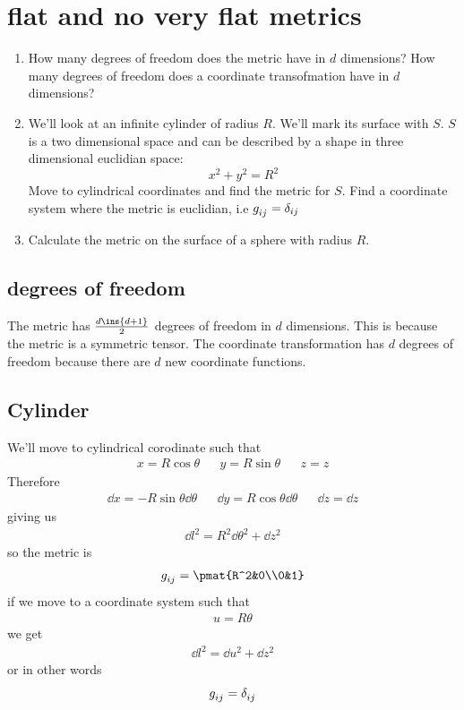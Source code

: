 \clearpage
\section{flat and no very flat metrics}
\begin{colbox}
	\begin{enumerate}
		\item How many degrees of freedom does the metric have in \(d\) dimensions? How many degrees of freedom does a coordinate transofmation have in \(d\) dimensions?
		\item We'll look at an infinite cylinder of radius \(R\). We'll mark its surface with \(S\). \(S\) is a two dimensional space and can be described by a shape in three dimensional euclidian space:
		\begin{equation}
			x^2+y^2=R^2
		\end{equation}
		Move to cylindrical coordinates and find the metric for \(S\). Find a coordinate system where the metric is euclidian, i.e \(g\indices{_i_j} = \delta_{ij}\)
		\item Calculate the metric on the surface of a sphere with radius \(R\).
	\end{enumerate}
\end{colbox}
\subsection{degrees of freedom}
The metric has \(\frac{d\ins{d+1}}{2}\) degrees of freedom in \(d\) dimensions. This is because the metric is a symmetric tensor. The coordinate transformation has \(d\) degrees of freedom because there are \(d\) new coordinate functions.
\subsection{Cylinder}
We'll move to cylindrical corodinate such that
\begin{align}
	x = R\cos\theta && y=R\sin\theta && z=z
\end{align}
Therefore
\begin{align}
	\dd x = -R\sin\theta\dd\theta && \dd y = R\cos\theta\dd\theta && \dd z = \dd z
\end{align}
giving us
\begin{align}
	\dd l^2 = R^2\dd\theta^2 + \dd z^2
\end{align}
so the metric is
\begin{align}
	g\indices{_{ij}} = \pmat{R^2&0\\0&1}
\end{align}
if we move to a coordinate system such that
\begin{align}
	u=R\theta
\end{align}
we get
\begin{align}
	\dd l^2 = \dd u^2 + \dd z^2
\end{align}
or in other words
\begin{equation}
	g\indices{_{ij}} = \delta\indices{_{ij}}
\end{equation}
